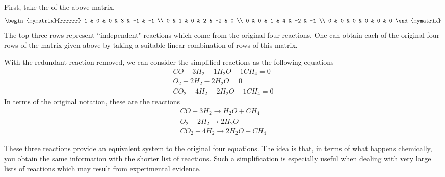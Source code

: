 First, take the {\rref} of the above matrix. 
\begin{equation*}
\begin{mymatrix}{rrrrrr}
1 & 0 & 0 & 3 & -1 & -1 \\
0 & 1 & 0 & 2 & -2 & 0 \\
0 & 0 & 1 & 4 & -2 & -1 \\
0 & 0 & 0 & 0 & 0 & 0
\end{mymatrix}
\end{equation*}
The top three rows represent \textquotedblleft independent" reactions which
come from the original four reactions. One can obtain each of the original
four rows of the  matrix given above by taking a suitable
linear combination of rows of this {\rref} matrix.

With the redundant reaction removed, we can consider the simplified reactions as the following equations
\begin{equation*}
\begin{array}{c}
CO+3H_{2}-1H_{2}O-1CH_{4}=0 \\
O_{2}+2H_{2}-2H_{2}O=0 \\
CO_{2}+4H_{2}-2H_{2}O-1CH_{4}=0
\end{array}
\end{equation*}
In terms of the original notation, these are the reactions
\begin{equation*}
\begin{array}{c}
CO+3H_{2}\rightarrow H_{2}O+CH_{4} \\
O_{2}+2H_{2}\rightarrow 2H_{2}O \\
CO_{2}+4H_{2}\rightarrow 2H_{2}O+CH_{4}
\end{array}
\end{equation*}

These three reactions provide an equivalent system to the original four equations. The idea is that, in terms of what happens chemically, you
obtain the same information with the shorter list of reactions. Such a simplification is especially useful when dealing with very large lists of reactions which may result from experimental evidence. 
